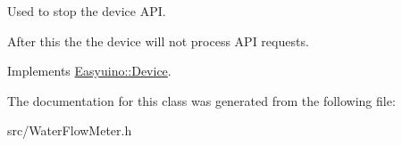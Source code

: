 Used to stop the device A\+PI. 

After this the the device will not process A\+PI requests. 

Implements \hyperlink{class_easyuino_1_1_device_ab31018ef64adc84aa2ea575b2297548f}{Easyuino\+::\+Device}.



The documentation for this class was generated from the following file\+:\begin{DoxyCompactItemize}
\item 
src/Water\+Flow\+Meter.\+h\end{DoxyCompactItemize}
